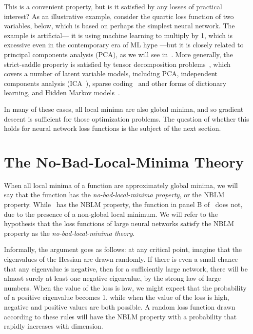 \documentclass[../../thesis.tex]{subfiles}
\begin{document}
This is a convenient property, but is it satisfied
by any losses of practical interest?
As an illustrative example, consider the quartic loss function
of two variables,  below,
which is based on perhaps the simplest neural network.
The example is artificial---
it is using machine learning to multiply by 1,
which is excessive even in the contemporary era of ML hype
---but it is closely related to principal components analysis (PCA),
as we will see in~.
More generally, the strict-saddle property is
satisfied by tensor decomposition problems~\cite{ge2015},
which covers a number of latent variable models, including
PCA,
independent components analysis (ICA~\cite{bell1997,comon2009}),
sparse coding~\cite{olshausen1996}
and other forms of dictionary learning,
and Hidden Markov models~\cite{anandkumar2012}.

In many of these cases,
all local minima are also global minima,
and so gradient descent is sufficient for
those optimization problems.
The question of whether this holds for neural network loss functions
is the subject of the next section.

\section{The No-Bad-Local-Minima Theory}

When all local minima of a function
are approximately global minima,
we will say that the function has the
\emph{no-bad-local-minima property},
or the NBLM property.
While~ has the NBLM property,
the function in panel B of~
does not, due to the presence of a non-global local minimum.
We will refer to the hypothesis that
the loss functions of large neural networks
satisfy the NBLM property as the
\emph{no-bad-local-minima theory}.

Informally, the argument goes as follows:
at any critical point, imagine that the eigenvalues
of the Hessian are drawn randomly.
If there is even a small chance that any eigenvalue is negative,
then for a sufficiently large network,
there will be almost surely at least one negative eigenvalue,
by the strong law of large numbers.
When the value of the loss is low,
we might expect that the probability of a positive eigenvalue becomes 1,
while when the value of the loss is high,
negative and positive values are both possible.
A random loss function drawn according to these rules
will have the NBLM property with a probability that
rapidly increases with dimension.
\end{document}

